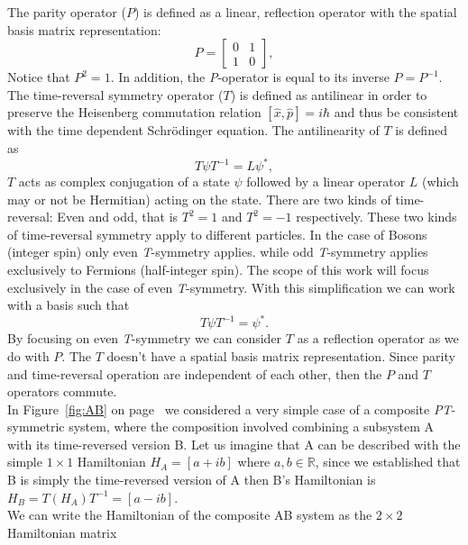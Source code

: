 \documentclass[10pt, a4paper, singlespacing, headsepline]{report}
\newcommand\PT{\emph{PT}}
\newcommand\PP{\emph{P}}
\newcommand\TT{\emph{T}}
\begin{document}
The parity operator ($P$) is defined as a linear, reflection operator with the spatial basis matrix representation:
\begin{equation} \label{eq:2}
P = \begin{bmatrix}
0 & 1 \\ 
1 & 0
\end{bmatrix},
\end{equation}
Notice that $P^2 = 1$. In addition, the \PP-operator is equal to its inverse $P = P^{-1}$.\\
The time-reversal symmetry operator ($T$) is defined as antilinear in order to preserve the Heisenberg commutation relation $[\hat{x}, \hat{p}] = i\hbar$\cite{BenderPT} and thus be consistent with the time dependent Schrödinger equation\cite{Jones-Smith}.
The antilinearity of $T$ is defined as 
\begin{equation} \label{eq:3}
T \psi T^{-1}= L \psi^{*},
\end{equation}  
$T$ acts as complex conjugation of a state $\psi$ followed by a linear operator $L$ (which may or not be Hermitian) acting on the state. There are two kinds of time-reversal: Even and odd, that is $T^2 = 1$ and $T^2 = -1$ respectively. These two kinds of time-reversal symmetry apply to different particles. In the case of Bosons (integer spin) only even \TT-symmetry applies. while odd \TT-symmetry applies exclusively to Fermions (half-integer spin)\cite{Jones-Smith}.
The scope of this work will focus exclusively in the case of even \TT-symmetry. With this simplification we can work with a basis such that 
\begin{equation} \label{eq:4}
T \psi T^{-1} = \psi^{*}.
\end{equation}
By focusing on even \TT-symmetry we can consider $T$ as a reflection operator as we do with $P$. The $T$ doesn't have a spatial basis matrix representation.
Since parity and time-reversal operation are independent of each other, then the $P$ and $T$ operators commute\cite{BenderPT}.\\
In Figure~\ref{fig:AB} on page~\pageref{fig:AB} we considered a very simple case of a composite \PT-symmetric system, where the composition involved combining a subsystem A with its time-reversed version B.
Let us imagine that A can be described with the simple $1 \times 1 $ Hamiltonian $H_{A} = [a+ib]$ where $a, b \in \mathds{R}$, since we established that B is simply the time-reversed version of A then B's Hamiltonian is $H_{B} = T (H_{A}) T^{-1} = [a-ib]$.\\
We can write the Hamiltonian of the composite AB system as the $2 \times 2$ Hamiltonian matrix
\end{document}
